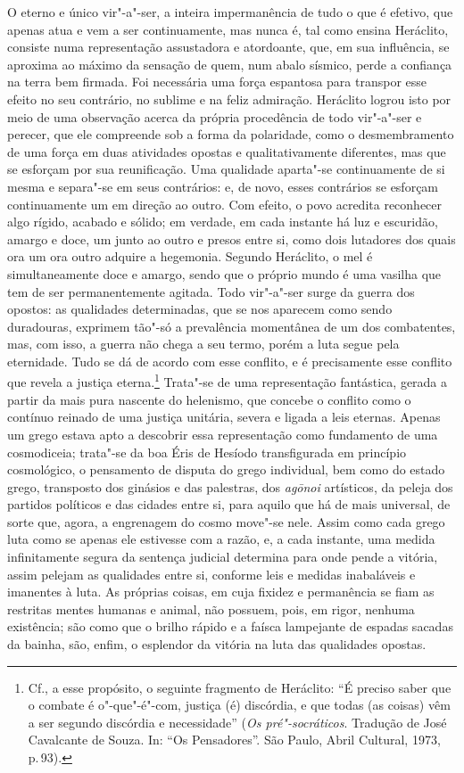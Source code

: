 O eterno e único vir"-a"-ser, a inteira impermanência de tudo o que é efetivo,
que apenas atua e vem a ser continuamente, mas nunca é, tal como ensina
Heráclito, consiste numa representação assustadora e atordoante, que, em sua
influência, se aproxima ao máximo da sensação de quem, num abalo sísmico,
perde a confiança na terra bem firmada. Foi \label{abalosismico} necessária
uma força espantosa para transpor esse efeito no seu contrário, no sublime e
na feliz admiração. Heráclito logrou isto por meio de uma observação acerca
da própria procedência de todo vir"-a"-ser e perecer, que ele compreende sob
a forma da polaridade, como o desmembramento de uma força em duas atividades
opostas e qualitativamente diferentes, mas que se esforçam por sua
reunificação. Uma qualidade aparta"-se continuamente de si mesma e separa"-se
em seus contrários: e, de novo, esses contrários se esforçam continuamente um
em direção ao outro. Com efeito, o povo acredita reconhecer algo rígido,
acabado e sólido; em verdade, em cada instante há luz e escuridão, amargo e
doce, um junto ao outro e presos entre si, como dois lutadores dos quais ora
um ora outro adquire a hegemonia. Segundo Heráclito, o mel é simultaneamente
doce e amargo, sendo que o próprio mundo é uma vasilha que tem de ser
permanentemente agitada. Todo vir"-a"-ser surge da guerra dos opostos: as
qualidades \label{guerradosopostos} determinadas, que se nos aparecem como
sendo duradouras, exprimem tão"-só a prevalência momentânea de um dos
combatentes, mas, com isso, a guerra não chega a seu termo, porém a luta
segue pela eternidade. Tudo se dá de acordo com esse conflito, e é
precisamente esse conflito que revela a justiça eterna.\footnote{Cf., a esse
propósito, o seguinte fragmento de Heráclito: ``É preciso saber que o combate
é o"-que"-é"-com, justiça (é) discórdia, e que todas (as coisas) vêm a ser
segundo discórdia e necessidade'' (\textit{Os pré"-socráticos}. Tradução de
José Cavalcante de Souza. In: ``Os Pensadores''. São Paulo, Abril Cultural,
1973, p.\,93).} Trata"-se de uma representação fantástica, gerada a partir da
mais pura nascente do helenismo, que concebe o conflito como o contínuo
reinado de uma justiça unitária, severa e ligada a leis eternas. Apenas um
grego estava apto a descobrir essa representação como fundamento de uma
cosmodiceia; trata"-se da boa Éris de Hesíodo transfigurada em princípio
cosmológico, o pensamento de disputa do grego individual, bem como do estado
grego, transposto dos ginásios e das palestras, dos \textit{ag\=onoi} 
artísticos, da peleja dos partidos políticos e das cidades entre
si, para aquilo que há de mais universal, de sorte que, agora, a engrenagem
do cosmo move"-se nele. Assim como cada grego luta como se apenas ele
estivesse com a razão, e, a cada instante, uma medida infinitamente segura da
sentença judicial determina para onde pende a vitória, assim pelejam as
qualidades entre si, conforme leis e medidas inabaláveis e imanentes à luta.
As próprias coisas, em cuja fixidez e permanência se fiam as restritas mentes
humanas e animal, não possuem, pois, em rigor, nenhuma existência; são como
que o brilho rápido e a faísca lampejante de espadas sacadas da bainha, são,
enfim, o esplendor da vitória na luta das qualidades opostas.

